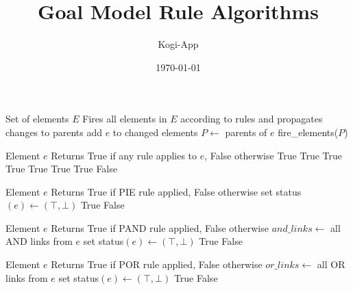 \documentclass{article}
\title{Goal Model Rule Algorithms}
\author{Kogi-App}
\date{\today}
\begin{document}
\begin{algorithm}[H]
\caption{fire\_elements}
\begin{algorithmic}[1]
\REQUIRE Set of elements $E$
\ENSURE Fires all elements in $E$ according to rules and propagates changes to parents
        \STATE add $e$ to changed elements
        \STATE $P \gets$ parents of $e$
        \STATE fire\_elements($P$)
    \ENDIF
\ENDFOR
\end{algorithmic}
\end{algorithm}

\begin{algorithm}[H]
\caption{try\_any\_rule}
\begin{algorithmic}[1]
\REQUIRE Element $e$
\ENSURE Returns True if any rule applies to $e$, False otherwise
    \RETURN True
    \RETURN True
    \RETURN True
    \RETURN True
    \RETURN True
    \RETURN True
    \RETURN True
\ELSE
    \RETURN False
\ENDIF
\end{algorithmic}
\end{algorithm}

\begin{algorithm}[H]
\caption{try\_pie\_rule}
\begin{algorithmic}[1]
\REQUIRE Element $e$
\ENSURE Returns True if PIE rule applied, False otherwise
    \STATE set status$(e) \gets (\top, \bot)$
    \RETURN True
\ELSE
    \RETURN False
\ENDIF
\end{algorithmic}
\end{algorithm}

\begin{algorithm}[H]
\caption{try\_pand\_rule}
\begin{algorithmic}[1]
\REQUIRE Element $e$
\ENSURE Returns True if PAND rule applied, False otherwise
\STATE $and\_links \gets$ all AND links from $e$
    \STATE set status$(e) \gets (\top, \bot)$
    \RETURN True
\ELSE
    \RETURN False
\ENDIF
\end{algorithmic}
\end{algorithm}

\begin{algorithm}[H]
\caption{try\_por\_rule}
\begin{algorithmic}[1]
\REQUIRE Element $e$
\ENSURE Returns True if POR rule applied, False otherwise
\STATE $or\_links \gets$ all OR links from $e$
    \STATE set status$(e) \gets (\top, \bot)$
    \RETURN True
\ELSE
    \RETURN False
\ENDIF
\end{algorithmic}
\end{algorithm}
\end{document}
